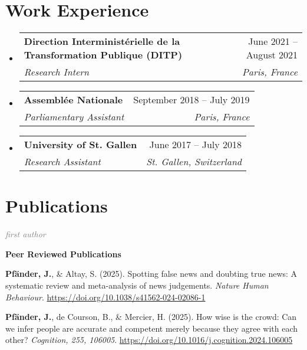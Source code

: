 \documentclass[letterpaper,11pt]{article}
\makeatletter
\newcommand{\resumeItem}[1]{
  \item\small{
    {#1 \vspace{-2pt}}
  }
}
\newcommand{\resumeSubheading}[4]{
  \vspace{1pt}\item
    \begin{tabular*}{0.97\textwidth}[t]{l@{\extracolsep{\fill}}r}
      \textbf{#1} & #2 \\
      \textit{\small#3} & \textit{\small #4} \\
    \end{tabular*}\vspace{-7pt}
}
\newcommand{\resumeSubSubheading}[2]{
    \item
    \begin{tabular*}{0.97\textwidth}{l@{\extracolsep{\fill}}r}
      \textit{\small#1} & \textit{\small #2} \\
    \end{tabular*}\vspace{-7pt}
}
\newcommand{\resumePublicationHeading}[1]{
  \vspace{5pt} %
  \noindent\textbf{\small #1} %
  \vspace{2pt} %
}
\newcommand{\resumeSubHeadingListStart}{\begin{itemize}[leftmargin=0.15in, label={}]}
\newcommand{\resumeSubHeadingListEnd}{\end{itemize}}
\newcommand{\resumeItemListStart}{\begin{itemize}}
\newcommand{\resumeItemListEnd}{\end{itemize}\vspace{-5pt}}
\makeatother
\begin{document}
\section{Work Experience}
  \resumeSubHeadingListStart

    \resumeSubheading
      {Direction Interministérielle de la Transformation Publique (DITP)}{June 2021 -- August 2021}
      {Research Intern}{Paris, France}
      
    \resumeSubheading
      {Assemblée Nationale}{September 2018 -- July 2019}
      {Parliamentary Assistant}{Paris, France}

    \resumeSubheading
      {University of St. Gallen}{June 2017 -- July 2018}
      {Research Assistant}{St. Gallen, Switzerland}
      

  \resumeSubHeadingListEnd

\section{Publications}


\small

\noindent\textcolor{gray}{\textit{\footnotemark[1]first author}}
\vspace{5pt} %

\resumePublicationHeading{Peer Reviewed Publications}
\begin{enumerate}[label={[{\arabic*.}]}, left=0.15in]
    \resumeItem{\textbf{Pfänder, J.\footnotemark[1]}, \& Altay, S. (2025). Spotting false news and doubting true news: A systematic review and meta-analysis of news judgements. \emph{Nature Human Behaviour}. \url{https://doi.org/10.1038/s41562-024-02086-1}
    }
    \resumeItem{\textbf{Pfänder, J.\footnotemark[1]}, de Courson, B., & Mercier, H. (2025). How wise is the crowd: Can we infer people are accurate and competent merely because they agree with each other? \emph{Cognition, 255, 106005}. \url{https://doi.org/10.1016/j.cognition.2024.106005}
    }

\end{enumerate}
\end{document}
